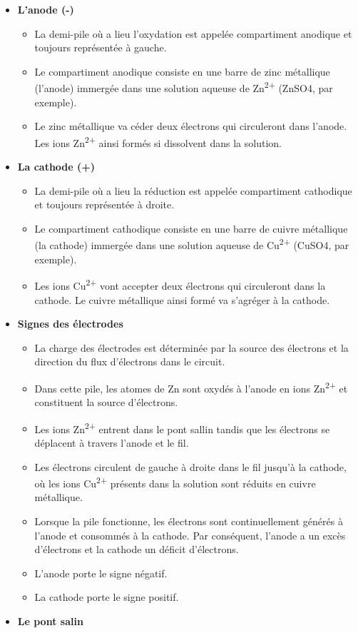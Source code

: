 \documentclass[
  11pt,
  a4paper,
  openany]{book}
\providecommand{\tightlist}{%
  \setlength{\itemsep}{0pt}\setlength{\parskip}{0pt}}
\begin{document}
\begin{itemize}
\tightlist
\item
  \textbf{L'anode (-)}

  \begin{itemize}
  \tightlist
  \item
    La demi-pile où a lieu l'oxydation est appelée compartiment anodique et toujours représentée à gauche.
  \item
    Le compartiment anodique consiste en une barre de zinc métallique (l'anode) immergée dans une solution aqueuse de Zn\textsuperscript{2+} (ZnSO4, par exemple).
  \item
    Le zinc métallique va céder deux électrons qui circuleront dans l'anode. Les ions Zn\textsuperscript{2+} ainsi formés si dissolvent dans la solution.
  \end{itemize}
\item
  \textbf{La cathode (+)}

  \begin{itemize}
  \tightlist
  \item
    La demi-pile où a lieu la réduction est appelée compartiment cathodique et toujours représentée à droite.
  \item
    Le compartiment cathodique consiste en une barre de cuivre métallique (la cathode) immergée dans une solution aqueuse de Cu\textsuperscript{2+} (CuSO4, par exemple).
  \item
    Les ions Cu\textsuperscript{2+} vont accepter deux électrons qui circuleront dans la cathode. Le cuivre métallique ainsi formé va s'agréger à la cathode.
  \end{itemize}
\item
  \textbf{Signes des électrodes}

  \begin{itemize}
  \tightlist
  \item
    La charge des électrodes est déterminée par la source des électrons et la direction du flux d'électrons dans le circuit.
  \item
    Dans cette pile, les atomes de Zn sont oxydés à l'anode en ions Zn\textsuperscript{2+} et constituent la source d'électrons.
  \item
    Les ions Zn\textsuperscript{2+} entrent dans le pont sallin tandis que les électrons se déplacent à travers l'anode et le fil.
  \item
    Les électrons circulent de gauche à droite dans le fil jusqu'à la cathode, où les ions Cu\textsuperscript{2+} présents dans la solution sont réduits en cuivre métallique.
  \item
    Lorsque la pile fonctionne, les électrons sont continuellement générés à l'anode et consommés à la cathode. Par conséquent, l'anode a un excès d'électrons et la cathode un déficit d'électrons.
  \item
    L'anode porte le signe négatif.
  \item
    La cathode porte le signe positif.
  \end{itemize}
\item
  \textbf{Le pont salin}


\end{itemize}
\end{document}
